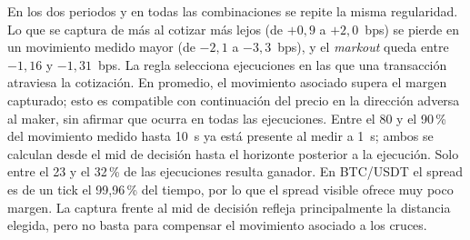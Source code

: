 \begin{table}[htbp]
\centering\footnotesize
\caption[Captura, movimiento del precio y markout.]{Descomposición de la pérdida por ejecución (bps; media por ejecución): distancia capturada frente al mid de decisión, movimiento desde ese mid hasta 1 y 10~s después de ejecutar, y \textit{markout} a 10~s. Modelos congelados.}
\label{tab:sa}
\end{table}

En los dos periodos y en todas las combinaciones se repite la misma regularidad. Lo que se captura de más al cotizar más lejos (de $+0{,}9$ a $+2{,}0$~bps) se pierde en un movimiento medido mayor (de $-2{,}1$ a $-3{,}3$~bps), y el \textit{markout} queda entre $-1{,}16$ y $-1{,}31$~bps. La regla selecciona ejecuciones en las que una transacción atraviesa la cotización. En promedio, el movimiento asociado supera el margen capturado; esto es compatible con continuación del precio en la dirección adversa al maker, sin afirmar que ocurra en todas las ejecuciones. Entre el 80 y el 90\,\% del movimiento medido hasta 10~s ya está presente al medir a 1~s; ambos se calculan desde el mid de decisión hasta el horizonte posterior a la ejecución. Solo entre el 23 y el 32\,\% de las ejecuciones resulta ganador. En BTC/USDT el spread es de un tick el 99,96\,\% del tiempo, por lo que el spread visible ofrece muy poco margen. La captura frente al mid de decisión refleja principalmente la distancia elegida, pero no basta para compensar el movimiento asociado a los cruces.


